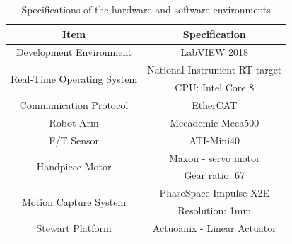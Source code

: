 \begin{table}[htbp]
\centering
\caption{Specifications of the hardware and software environments}
\label{tab:exp_specification}
\par
\begin{tabular}{|c|c|} 
\hline
Item											&Specification					\\	\hline
Development Environment							&LabVIEW 2018					\\	\hline
\multirow{2}{*}{Real-Time Operating System}		&National Instrument-RT target	\\
												&CPU: Intel Core 8				\\	\hline
Communication Protocol							&EtherCAT						\\	\hline
Robot Arm										&Mecademic-Meca500				\\	\hline
F/T Sensor										&ATI-Mini40						\\	\hline
\multirow{2}{*}{Handpiece Motor}							&Maxon - servo motor				\\
												&Gear ratio: 67					\\	\hline
\multirow{2}{*}{Motion Capture System}			&PhaseSpace-Impulse X2E 		\\
												&Resolution: 1mm				\\	\hline
Stewart Platform								&Actuoanix - Linear Actuator				\\	
\hline
\end{tabular}
\end{table}

